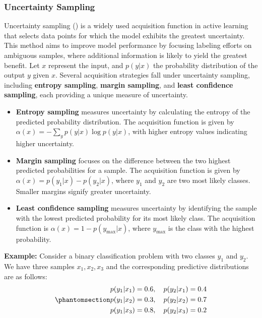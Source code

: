 \documentclass[
  letterpaper,
  numbers=noenddot,
  DIV=11]{scrreprt}
\theoremstyle{plain}
\theoremstyle{definition}
\theoremstyle{plain}
\theoremstyle{remark}
\begin{document}
\subsubsection*{Uncertainty Sampling}\label{uncertainty-sampling}

Uncertainty sampling () is
a widely used acquisition function in active learning that selects data
points for which the model exhibits the greatest uncertainty. This
method aims to improve model performance by focusing labeling efforts on
ambiguous samples, where additional information is likely to yield the
greatest benefit. Let \(x\) represent the input, and \(p(y|x)\) the
probability distribution of the output \(y\) given \(x\). Several
acquisition strategies fall under uncertainty sampling, including
\textbf{entropy sampling}, \textbf{margin sampling}, and \textbf{least
confidence sampling}, each providing a unique measure of uncertainty.

\begin{itemize}
\item
  \textbf{Entropy sampling} measures uncertainty by calculating the
  entropy of the predicted probability distribution. The acquisition
  function is given by \(\alpha(x) = - \sum_{y} p(y|x) \log p(y|x)\),
  with higher entropy values indicating higher uncertainty.
\item
  \textbf{Margin sampling} focuses on the difference between the two
  highest predicted probabilities for a sample. The acquisition function
  is given by \(\alpha(x) = p(y_1|x) - p(y_2|x)\), where \(y_1\) and
  \(y_2\) are two most likely classes. Smaller margins signify greater
  uncertainty.
\item
  \textbf{Least confidence sampling} measures uncertainty by identifying
  the sample with the lowest predicted probability for its most likely
  class. The acquisition function is
  \(\alpha(x) = 1 - p(y_{\text{max}}|x)\), where \(y_{\text{max}}\) is
  the class with the highest probability.
\end{itemize}

\textbf{Example:} Consider a binary classification problem with two
classes \(y_1\) and \(y_2\). We have three samples \(x_1, x_2, x_3\) and
the corresponding predictive distributions are as follows:
\begin{equation}\phantomsection\label{eq-eq3.1}{\begin{aligned}
p(y_1|x_1) &= 0.6, \quad p(y_2|x_1) = 0.4\\
p(y_1|x_2) &= 0.3, \quad p(y_2|x_2) = 0.7\\
p(y_1|x_3) &= 0.8, \quad p(y_2|x_3) = 0.2
\end{aligned}}\end{equation}
\end{document}
